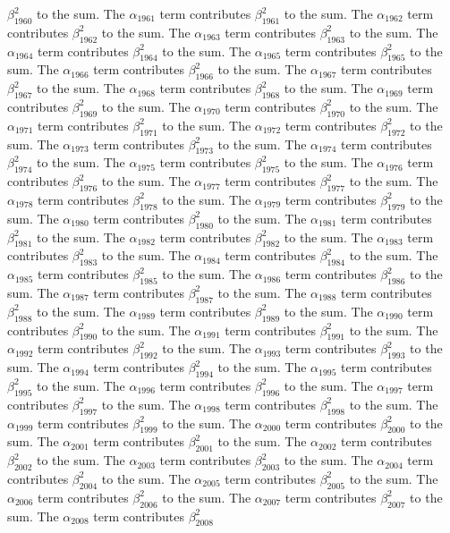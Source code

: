 \begin{lemma}
$\beta_{1960}^{2}$ to the sum. The $\alpha_{1961}$ term contributes $\beta_{1961}^{2}$ to the sum. The $\alpha_{1962}$ term contributes $\beta_{1962}^{2}$ to the sum. The $\alpha_{1963}$ term contributes $\beta_{1963}^{2}$ to the sum. The $\alpha_{1964}$ term contributes $\beta_{1964}^{2}$ to the sum. The $\alpha_{1965}$ term contributes $\beta_{1965}^{2}$ to the sum. The $\alpha_{1966}$ term contributes $\beta_{1966}^{2}$ to the sum. The $\alpha_{1967}$ term contributes $\beta_{1967}^{2}$ to the sum. The $\alpha_{1968}$ term contributes $\beta_{1968}^{2}$ to the sum. The $\alpha_{1969}$ term contributes $\beta_{1969}^{2}$ to the sum. The $\alpha_{1970}$ term contributes $\beta_{1970}^{2}$ to the sum. The $\alpha_{1971}$ term contributes $\beta_{1971}^{2}$ to the sum. The $\alpha_{1972}$ term contributes $\beta_{1972}^{2}$ to the sum. The $\alpha_{1973}$ term contributes $\beta_{1973}^{2}$ to the sum. The $\alpha_{1974}$ term contributes $\beta_{1974}^{2}$ to the sum. The $\alpha_{1975}$ term contributes $\beta_{1975}^{2}$ to the sum. The $\alpha_{1976}$ term contributes $\beta_{1976}^{2}$ to the sum. The $\alpha_{1977}$ term contributes $\beta_{1977}^{2}$ to the sum. The $\alpha_{1978}$ term contributes $\beta_{1978}^{2}$ to the sum. The $\alpha_{1979}$ term contributes $\beta_{1979}^{2}$ to the sum. The $\alpha_{1980}$ term contributes $\beta_{1980}^{2}$ to the sum. The $\alpha_{1981}$ term contributes $\beta_{1981}^{2}$ to the sum. The $\alpha_{1982}$ term contributes $\beta_{1982}^{2}$ to the sum. The $\alpha_{1983}$ term contributes $\beta_{1983}^{2}$ to the sum. The $\alpha_{1984}$ term contributes $\beta_{1984}^{2}$ to the sum. The $\alpha_{1985}$ term contributes $\beta_{1985}^{2}$ to the sum. The $\alpha_{1986}$ term contributes $\beta_{1986}^{2}$ to the sum. The $\alpha_{1987}$ term contributes $\beta_{1987}^{2}$ to the sum. The $\alpha_{1988}$ term contributes $\beta_{1988}^{2}$ to the sum. The $\alpha_{1989}$ term contributes $\beta_{1989}^{2}$ to the sum. The $\alpha_{1990}$ term contributes $\beta_{1990}^{2}$ to the sum. The $\alpha_{1991}$ term contributes $\beta_{1991}^{2}$ to the sum. The $\alpha_{1992}$ term contributes $\beta_{1992}^{2}$ to the sum. The $\alpha_{1993}$ term contributes $\beta_{1993}^{2}$ to the sum. The $\alpha_{1994}$ term contributes $\beta_{1994}^{2}$ to the sum. The $\alpha_{1995}$ term contributes $\beta_{1995}^{2}$ to the sum. The $\alpha_{1996}$ term contributes $\beta_{1996}^{2}$ to the sum. The $\alpha_{1997}$ term contributes $\beta_{1997}^{2}$ to the sum. The $\alpha_{1998}$ term contributes $\beta_{1998}^{2}$ to the sum. The $\alpha_{1999}$ term contributes $\beta_{1999}^{2}$ to the sum. The $\alpha_{2000}$ term contributes $\beta_{2000}^{2}$ to the sum. The $\alpha_{2001}$ term contributes $\beta_{2001}^{2}$ to the sum. The $\alpha_{2002}$ term contributes $\beta_{2002}^{2}$ to the sum. The $\alpha_{2003}$ term contributes $\beta_{2003}^{2}$ to the sum. The $\alpha_{2004}$ term contributes $\beta_{2004}^{2}$ to the sum. The $\alpha_{2005}$ term contributes $\beta_{2005}^{2}$ to the sum. The $\alpha_{2006}$ term contributes $\beta_{2006}^{2}$ to the sum. The $\alpha_{2007}$ term contributes $\beta_{2007}^{2}$ to the sum. The $\alpha_{2008}$ term contributes $\beta_{2008}^{2}$ 
\end{lemma}

